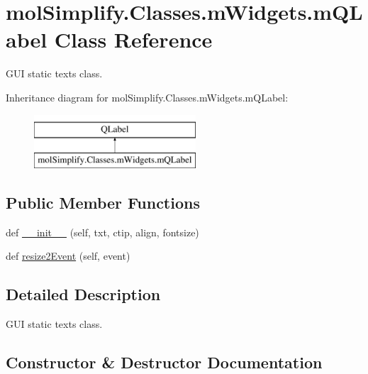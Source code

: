 \hypertarget{classmolSimplify_1_1Classes_1_1mWidgets_1_1mQLabel}{}\section{mol\+Simplify.\+Classes.\+m\+Widgets.\+m\+Q\+Label Class Reference}
\label{classmolSimplify_1_1Classes_1_1mWidgets_1_1mQLabel}


G\+UI static texts class.  


Inheritance diagram for mol\+Simplify.\+Classes.\+m\+Widgets.\+m\+Q\+Label\+:\begin{figure}[H]
\begin{center}
\leavevmode
\includegraphics[height=2.000000cm]{classmolSimplify_1_1Classes_1_1mWidgets_1_1mQLabel}
\end{center}
\end{figure}
\subsection*{Public Member Functions}
\begin{DoxyCompactItemize}
\item 
def \hyperlink{classmolSimplify_1_1Classes_1_1mWidgets_1_1mQLabel_aefeede684761e86741538bbe607600dc}{\+\_\+\+\_\+init\+\_\+\+\_\+} (self, txt, ctip, align, fontsize)
\item 
def \hyperlink{classmolSimplify_1_1Classes_1_1mWidgets_1_1mQLabel_ac4b868e52cbb2ef6f8974cef329f6dba}{resize2\+Event} (self, event)
\end{DoxyCompactItemize}


\subsection{Detailed Description}
G\+UI static texts class. 

\subsection{Constructor \& Destructor Documentation}
\mbox{\label{classmolSimplify_1_1Classes_1_1mWidgets_1_1mQLabel_aefeede684761e86741538bbe607600dc}} 
